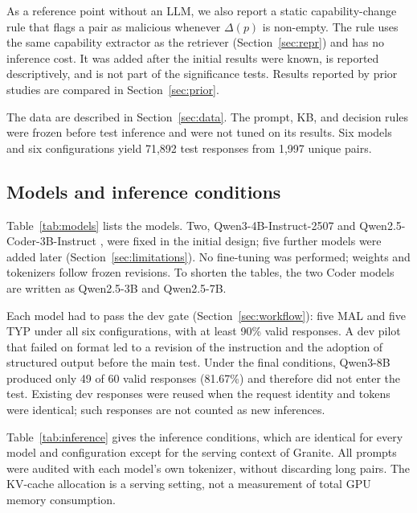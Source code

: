 \documentclass[a4paper,fleqn]{cas-dc}
\begin{document}
As a reference point without an LLM, we also report a static capability-change
rule that flags a pair as malicious whenever $\Delta(p)$ is non-empty. The rule
uses the same capability extractor as the retriever (Section~\ref{sec:repr}) and
has no inference cost. It was added after the initial results were known, is
reported descriptively, and is not part of the significance tests. Results
reported by prior studies are compared in Section~\ref{sec:prior}.

The data are described in Section~\ref{sec:data}. The prompt, KB, and decision
rules were frozen before test inference and were not tuned on its results. Six
models and six configurations yield 71,892 test responses from 1,997 unique
pairs.

\subsection{Models and inference conditions}\label{sec:models}
Table~\ref{tab:models} lists the models. Two, Qwen3-4B-Instruct-2507
\citep{yang2025qwen3} and Qwen2.5-Coder-3B-Instruct \citep{hui2024qwen25coder},
were fixed in the initial design; five further models were added later
(Section~\ref{sec:limitations}). No fine-tuning was performed; weights and
tokenizers follow frozen revisions. To shorten the tables, the two Coder models
are written as Qwen2.5-3B and Qwen2.5-7B.

Each model had to pass the dev gate (Section~\ref{sec:workflow}): five MAL and
five TYP under all six configurations, with at least 90\% valid responses. A dev
pilot that failed on format led to a revision of the instruction and the
adoption of structured output before the main test. Under the final conditions,
Qwen3-8B produced only 49 of 60 valid responses (81.67\%) and therefore did not
enter the test. Existing dev responses were reused when the request identity
and tokens were identical; such responses are not counted as new inferences.

Table~\ref{tab:inference} gives the inference conditions, which are identical
for every model and configuration except for the serving context of Granite.
All prompts were audited with each model's own tokenizer, without discarding
long pairs. The KV-cache allocation is a serving setting, not a measurement of
total GPU memory consumption.
\end{document}
